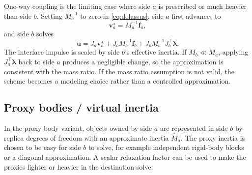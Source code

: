 \documentclass[11pt]{article}
\newcommand{\va}{\bm v_a}
\newcommand{\uu}{\bm u}
\newcommand{\fa}{\bm f_a}
\newcommand{\fb}{\bm f_b}
\newcommand{\lam}{\bm\lambda}
\newcommand{\Ja}{J_a}
\newcommand{\Jb}{J_b}
\newcommand{\Ma}{M_a}
\newcommand{\Mb}{M_b}
\newcommand{\Mhat}{\widehat M_a}
\begin{document}
One-way coupling is the limiting case where side $a$ is prescribed or much heavier than
side $b$. Setting $\Ma^{-1}$ to zero in \eqref{eq:delassus}, side $a$ first advances to
\[
    \va^\star=\Ma^{-1}\fa ,
\]
and side $b$ solves
\begin{equation}
    \uu =
      \Ja\va^\star
    + \Jb\Mb^{-1}\fb
    + \Jb\Mb^{-1}\Jb^\top\lam .
    \label{eq:one-way}
\end{equation}
The interface impulse is scaled by side $b$'s effective inertia. If
$\Mb \ll \Ma$, applying $\Ja^\top\lam$ back to side $a$ produces a negligible change,
so the approximation is consistent with the mass ratio. If the mass ratio assumption is
not valid, the scheme becomes a modeling choice rather than a controlled
approximation.

\subsection{Proxy bodies / virtual inertia}

In the proxy-body variant, objects owned by side $a$ are represented in side $b$ by
replica degrees of freedom with an approximate inertia $\Mhat$. The proxy inertia is
chosen to be easy for side $b$ to solve, for example independent rigid-body blocks or a
diagonal approximation. A scalar relaxation factor can be used to make the proxies
lighter or heavier in the destination solve.
\end{document}
